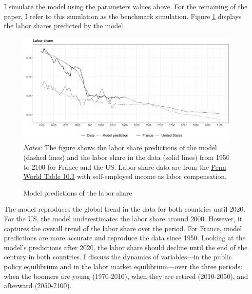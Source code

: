 I simulate the model using the parameters values above. For the remaining of the paper, I refer to this simulation as the benchmark simulation. Figure \ref{chap1-fig:quant-bench-ls} displays the labor shares predicted by the model.
\begin{figure}[!tb]
	\centering
	\caption{Model predictions of the labor share} \label{chap1-fig:quant-bench-ls}
	\includegraphics[width=1\linewidth]{chap1/graphic/quant-bench-ls.png}
	\vspace{-3em}
	\justify\singlespacing\footnotesize\textit{Notes:} The figure shows the labor share predictions of the model (dashed lines) and the labor share in the data (solid lines) from 1950 to 2100 for France and the US.
	Labor share data are from the \href{https://www.rug.nl/ggdc/productivity/pwt/}{Penn World Table 10.1} with self-employed income as labor compensation.
\end{figure}
The model reproduces the global trend in the data for both countries until 2020. For the US, the model underestimates the labor share around 2000. However, it captures the overall trend of the labor share over the period.
For France, model predictions are more accurate and reproduce the data since 1950. Looking at the model's predictions after 2020, the labor share should decline until the end of the century in both countries. I discuss the dynamics of variables---in the public policy equilibrium and in the labor market equilibrium---over the three periods: when the boomers are young (1970-2010), when they are retired (2010-2050), and afterward (2050-2100).

